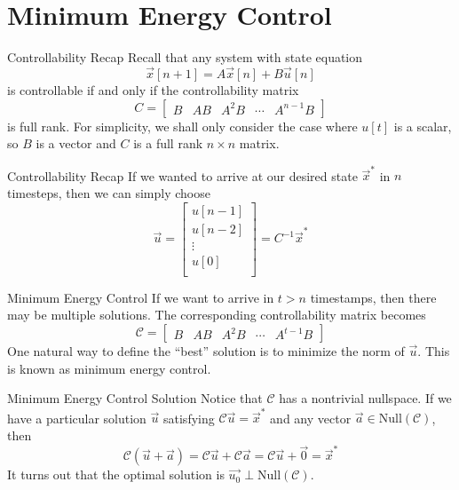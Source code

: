 \section{Minimum Energy Control}

\begin{frame}{Controllability Recap}
	Recall that any system with state equation
	\[
		\vec{x}[n+1] = A\vec{x}[n] + B\vec{u}[n]
	\]
   	is controllable if and only if the controllability matrix
    \[
        C = 
        \begin{bmatrix}
        B & AB & A^2B & \cdots & A^{n-1}B
        \end{bmatrix}
    \]
    is full rank. For simplicity, we shall only consider the case where $u[t]$ is a scalar, so $B$ is a vector and $C$ is a full rank $n \times n$ matrix.
\end{frame}

\begin{frame}{Controllability Recap}
	If we wanted to arrive at our desired state $\vec{x}^*$ in $n$ timesteps, then we can simply choose
	\[
		\vec{u} 
		=
		\begin{bmatrix}
			u[n-1] \\
			u[n-2] \\
			\vdots \\
			u[0] \\
		\end{bmatrix}
		=
		C^{-1}\vec{x}^*
	\]
\end{frame}

\begin{frame}{Minimum Energy Control}
	If we want to arrive in $t > n$ timestamps, then there may be multiple solutions. The corresponding controllability matrix becomes
    \[
        \mathcal{C} = 
        \begin{bmatrix}
        B & AB & A^2B & \cdots & A^{t-1}B
        \end{bmatrix}
    \]
	One natural way to define the ``best'' solution is to minimize the norm of $\vec{u}$. This is known as minimum energy control.
\end{frame}

\begin{frame}{Minimum Energy Control Solution}
	Notice that $\mathcal{C}$ has a nontrivial nullspace. If we have a particular solution $\vec{u}$ satisfying $\mathcal{C} \vec{u} = \vec{x}^*$ and any vector $\vec{a} \in \mathrm{Null}(\mathcal{C})$, then
	\[
	\mathcal{C}(\vec{u} + \vec{a}) = \mathcal{C}\vec{u} + \mathcal{C}\vec{a} = \mathcal{C}\vec{u} + \vec{0} = \vec{x}^*
	\]
	It turns out that the optimal solution is $\vec{u_0} \perp \mathrm{Null}(\mathcal{C})$.
\end{frame}

